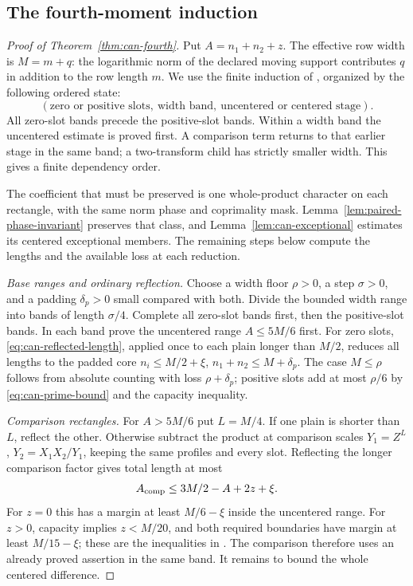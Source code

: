 \documentclass[11pt,a4paper]{article}
\numberwithin{equation}{section}
\theoremstyle{definition}
\theoremstyle{remark}
\begin{document}
\subsection{The fourth-moment induction}\label{subsec:fourth-induction}

\begin{proof}[Proof of Theorem~\ref{thm:can-fourth}]
Put $A=n_1+n_2+z$. The effective row width is $M=m+q$:
the logarithmic norm of the declared moving support contributes
$q$ in addition to the row length $m$. We use the finite induction of
\cite[Sections~18.2--18.8]{Q}, organized by the following ordered state:
\[
 (\text{zero or positive slots},\ \text{width band},\
   \text{uncentered or centered stage}).
\]
All zero-slot bands precede the positive-slot bands. Within a width
band the uncentered estimate is proved first. A comparison term returns
to that earlier stage in the same band; a two-transform child has
strictly smaller width. This gives a finite dependency order.

The coefficient that must be preserved is one whole-product character
on each rectangle, with the same norm phase and coprimality mask.
Lemma~\ref{lem:paired-phase-invariant} preserves that class, and
Lemma~\ref{lem:can-exceptional} estimates its centered exceptional
members. The remaining steps below compute the lengths and the
available loss at each reduction.

\smallskip\noindent\emph{Base ranges and ordinary reflection.}
Choose a width floor $\rho>0$, a step $\sigma>0$, and a padding
$\delta_p>0$ small compared with both.  Divide the bounded width
range into bands of length $\sigma/4$.  Complete all zero-slot
bands first, then the positive-slot bands.  In each band prove
the uncentered range $A\le5M/6$ first.  For zero slots,
\eqref{eq:can-reflected-length}, applied once to each plain longer
than $M/2$, reduces all lengths to the padded core
$n_i\le M/2+\xi$, $n_1+n_2\le M+\delta_p$.
The case $M\le\rho$ follows from absolute counting with loss
$\rho+\delta_p$; positive slots add at most $\rho/6$ by
\eqref{eq:can-prime-bound} and the capacity inequality.

\smallskip\noindent\emph{Comparison rectangles.}
For $A>5M/6$ put $L=M/4$.  If one plain is shorter than $L$,
reflect the other.  Otherwise subtract the product at comparison
scales $Y_1=Z^L$, $Y_2=X_1X_2/Y_1$, keeping the same profiles
and every slot.  Reflecting the longer comparison factor gives
total length at most
\[
 A_{\rm comp}\le3M/2-A+2z+\xi.
\]
For $z=0$ this has a margin at least $M/6-\xi$ inside the
uncentered range.  For $z>0$, capacity implies $z<M/20$,
and both required boundaries have margin at least $M/15-\xi$;
these are the inequalities in \cite[(18.15)--(18.16)]{Q}.
The comparison therefore uses an already proved assertion in
the same band.  It remains to bound the whole centered difference.


\end{proof}
\end{document}
